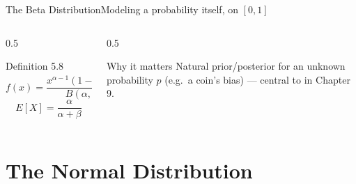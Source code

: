 \documentclass[aspectratio=169,11pt]{beamer}
\begin{document}
\begin{frame}{The Beta Distribution}{Modeling a probability itself, on $[0,1]$}
  \begin{columns}[T]
    \begin{column}{0.5\textwidth}
      \begin{block}{Definition 5.8}
        \[ f(x) = \frac{x^{\alpha-1}(1-x)^{\beta-1}}{B(\alpha,\beta)}, \; x\in[0,1] \]
        \[ E[X]=\frac{\alpha}{\alpha+\beta} \]
      \end{block}
    \end{column}
    \begin{column}{0.5\textwidth}
      \begin{exampleblock}{Why it matters}
        \small Natural prior/posterior for an unknown probability $p$
        (e.g.\ a coin's bias) — central to 
        in Chapter 9.
      \end{exampleblock}
    \end{column}
  \end{columns}
  \vfill
  \centering
\end{frame}

\section{The Normal Distribution}
\end{document}
